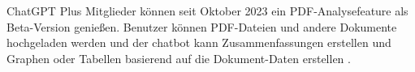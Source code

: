 ChatGPT Plus Mitglieder können seit Oktober 2023 ein PDF-Analysefeature als Beta-Version genießen. Benutzer können PDF-Dateien und andere Dokumente hochgeladen werden und der chatbot kann Zusammenfassungen erstellen und Graphen oder Tabellen basierend auf die Dokument-Daten erstellen \cite{hackernoon-claude}.












